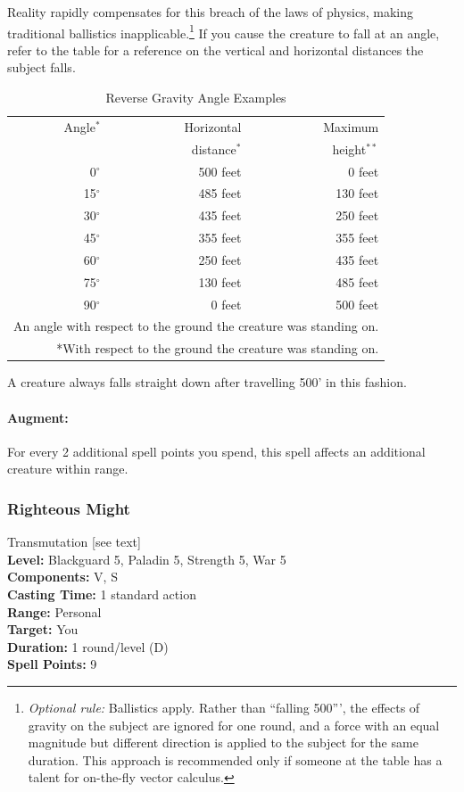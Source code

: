Reality rapidly compensates for this breach of the laws of physics, making traditional ballistics inapplicable.\footnote{\emph{Optional rule:}
Ballistics apply. Rather than ``falling 500''', the effects of gravity on the subject are ignored for one round, and a force with an equal magnitude
but different direction is applied to the subject for the same duration. 
This approach is recommended only if someone at the table has a talent for on-the-fly vector calculus.}
If you cause the creature to fall at an angle, 
refer to the  table for a reference on the vertical and horizontal distances the subject falls.
\begin{table}
\caption{Reverse Gravity Angle Examples}
\label{tab:ReverseGravity}
\begin{center}
\begin{tabular}{|r|r|r|}
\hline
Angle$^*$&Horizontal&Maximum\\
&distance$^{*}$&height$^{**}$\\
\hline
 0$^\circ$&500 feet&  0 feet\\
15$^\circ$&485 feet&130 feet\\
30$^\circ$&435 feet&250 feet\\
45$^\circ$&355 feet&355 feet\\
60$^\circ$&250 feet&435 feet\\
75$^\circ$&130 feet&485 feet\\
90$^\circ$&  0 feet&500 feet\\
\hline
\multicolumn{3}{p{5cm}}{\scriptsize *An angle with respect to the ground the creature was standing on.}\\
\multicolumn{3}{p{5cm}}{\scriptsize **With respect to the ground the creature was standing on.}
\end{tabular}
\end{center}
\end{table}
A creature always falls straight down after travelling 500' in this fashion.

\paragraph{Augment:} For every 2 additional spell points you spend, this spell affects an additional creature within range.
\subsubsection{Righteous Might}
\label{Spell:RighteousMight}
Transmutation [see text]
\\ \textbf{Level:} Blackguard 5, Paladin 5, Strength 5, War 5
\\ \textbf{Components:} V, S
\\ \textbf{Casting Time:} 1 standard action
\\ \textbf{Range:} Personal
\\ \textbf{Target:} You
\\ \textbf{Duration:} 1 round/level (D)
\\ \textbf{Spell Points:} 9

